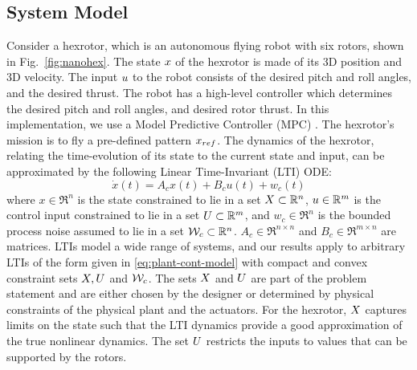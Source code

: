 \subsection{System Model}
\label{formulation}

Consider a hexrotor, which is an autonomous flying robot with six rotors, shown in Fig.~\ref{fig:nanohex}.
The state $x$ of the hexrotor is made of its 3D position and 3D velocity.
The input $u$ to the robot consists of the desired pitch and roll angles, and the desired thrust.
The robot has a high-level controller which determines the desired pitch and roll angles, and desired rotor thrust.
In this implementation, we use a Model Predictive Controller (MPC) \cite{camachoetal04mpc}.
The hexrotor's mission is to fly a pre-defined pattern $x_{ref}$.
The dynamics of the hexrotor, relating the time-evolution of its state to the current state and input, can be approximated by the following Linear Time-Invariant (LTI) ODE:
\begin{equation}
\dot{x}(t) = A_{c}x(t)+B_{c}u(t)+w_{c}(t)  \label{eq:plant-cont-model}
\end{equation}
where $x\in \Re^{n}$ is the state constrained to lie in a set $X \subset \mathbb{R}^n$,
$u\in\mathbb{R}^{m}$ is the control input constrained to lie in a set $U \subset \mathbb{R}^m$,
and $w_{c}\in\Re^{n}$ is the bounded process noise assumed to lie in a set $\mathcal{W}_c \subset \mathbb{R}^n$.
$A_c \in \Re^{n\times n}$ and $B_c \in \Re^{m\times n}$ are matrices.
LTIs model a wide range of systems, and our results apply to arbitrary LTIs of the form given in \eqref{eq:plant-cont-model} with compact and convex constraint sets $X,U$ and $\mathcal{W}_c$.
The sets $X$ and $U$ are part of the problem statement and are either chosen by the designer or determined by physical constraints of the physical plant and the actuators.
For the hexrotor, $X$ captures limits on the state such that the LTI dynamics provide a good approximation of the true nonlinear dynamics.
The set $U$ restricts the inputs to values that can be supported by the rotors.

